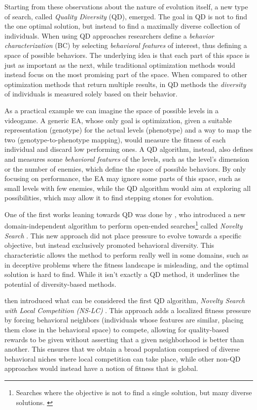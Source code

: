 Starting from these observations about the nature of evolution itself, a new type of search, called \textit{Quality Diversity} (QD), emerged. The goal in QD is not to find the one optimal solution, but instead to find a maximally diverse collection of individuals. When using QD approaches researchers define a \textit{behavior characterization} (BC) by selecting \textit{behavioral features} of interest, thus defining a space of possible behaviors. The underlying idea is that each part of this space is just as important as the next, while traditional optimization methods would instead focus on the most promising part of the space. When compared to other optimization methods that return multiple results, in QD methods the \textit{diversity} of individuals is measured solely based on their behavior. \cite{pugh_quality_2016}  

As a practical example we can imagine the space of possible levels in a videogame. A generic EA, whose only goal is optimization, given a suitable representation (genotype) for the actual levels (phenotype) and a way to map the two (genotype-to-phenotype mapping), would measure the fitness of each individual and discard low performing ones. A QD algorithm, instead, also defines and measures some \textit{behavioral features} of the levels, such as the level's dimension or the number of enemies, which define the space of possible behaviors. By only focusing on performance, the EA may ignore some parts of this space, such as small levels with few enemies, while the QD algorithm would aim at exploring all possibilities, which may allow it to find stepping stones for evolution.

One of the first works leaning towards QD was done by \citeauthor{lehman_exploiting_2008}, who introduced a new domain-independent algorithm to perform open-ended searches\footnote{Searches where the objective is not to find a single solution, but many diverse solutions. \cite{stanley_why_2019}} called \textit{Novelty Search} \cite{lehman_exploiting_2008}. This new approach did not place pressure to evolve towards a specific objective, but instead exclusively promoted behavioral diversity. This characteristic allows the method to perform really well in some domains, such as in deceptive problems where the fitness landscape is misleading, and the optimal solution is hard to find. While it isn't exactly a QD method, it underlines the potential of diversity-based methods. 

 then introduced what can be considered the first QD algorithm, \textit{Novelty Search with Local Competition (NS-LC)} \cite{lehman_evolving_2011}. This approach adds a localized fitness pressure by forcing behavioral neighbors (individuals whose features are similar, placing them close in the behavioral space) to compete, allowing for quality-based rewards to be given without asserting that a given neighborhood is better than another. This ensures that we obtain a broad population comprised of diverse behavioral niches where local competition can take place, while other non-QD approaches would instead have a notion of fitness that is global. 

